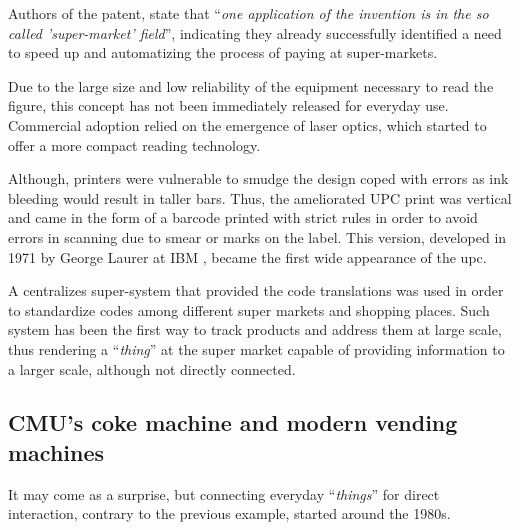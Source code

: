 			Authors of the patent, state  that ``\textit{one application of the invention is in the so called 'super-market' field}'', indicating they already successfully identified a need to speed up and automatizing the process of paying at super-markets.
			
			Due to the large size and low reliability of the equipment necessary to read the figure, this concept has not been immediately released for everyday use.
			Commercial adoption relied on the emergence of laser optics, which started to offer a more compact reading technology.
			
			Although, printers were vulnerable to smudge the design coped with errors as ink bleeding would result in taller bars.
			Thus, the ameliorated UPC print was vertical and came in the form of a barcode printed with strict rules in order to avoid errors in scanning due to smear or marks on the label.
			This version, developed in 1971 by George Laurer at IBM \cite{upc_ibm}, became the first wide appearance of the upc.
			
			A centralizes super-system that provided the code translations was used in order to standardize codes among different super markets and shopping places.
			Such system has been the first way to track products and address them at large scale, thus rendering a ``\textit{thing}'' at the super market capable of providing information to a larger scale, although not directly connected.
			
		\subsection{CMU's coke machine and modern vending machines}
	
		
			It may come as a surprise, but connecting everyday ``\textit{things}'' for direct interaction, contrary to the previous example, started around the 1980s.
			
